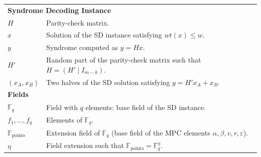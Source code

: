 \documentclass[11pt]{report}
\theoremstyle{definition}
\theoremstyle{plain}
\begin{document}
\begin{table}[]
\begin{tabular}{p{}p{}}
    \multicolumn{2}{l}{\textbf{Syndrome Decoding Instance}}                                                                               \\
    $H$                          & Parity-check matrix.                                                                                   \\
    $x$                          & Solution of the SD instance satisfying $wt(x) \leq w$.                                                 \\
    $y$                          & Syndrome computed as $y = Hx$.                                                                         \\
    $H'$                         & Random part of the parity-check matrix such that $H = (H' \mid I_{m-k})$.                              \\
    $(x_A, x_B)$                 & Two halves of the SD solution satisfying $y = H' x_A + x_B$.                                           \\ \hline

    \multicolumn{2}{l}{\textbf{Fields}}                                                                                                   \\
    $\mathbb{F}_q$               & Field with $q$ elements: base field of the SD instance.                                                \\
    $f_1, \ldots, f_q$           & Elements of $\mathbb{F}_q$.                                                                            \\
    $\mathbb{F}_{\text{points}}$ & Extension field of $\mathbb{F}_q$ (base field of the MPC elements $\alpha, \beta, v, r, \varepsilon$). \\
    $\eta$                       & Field extension such that $\mathbb{F}_{\text{points}} = \mathbb{F}_q^\eta$.                            \\ \hline


\end{tabular}
\end{table}
\end{document}
